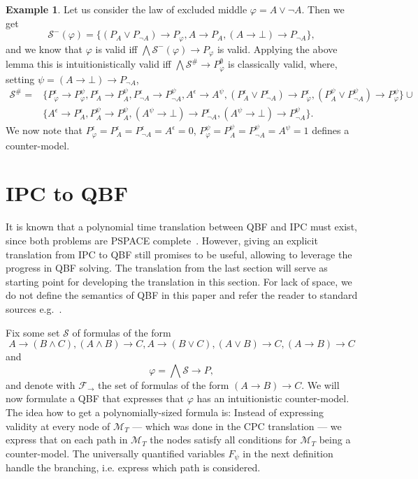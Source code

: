 \documentclass[a4paper,11pt]{report}
\theoremstyle{definition}
\theoremstyle{definition}
\theoremstyle{definition}
\theoremstyle{definition}
\theoremstyle{definition}
\theoremstyle{definition}
\newtheorem{example}[theorem]{Example}
\theoremstyle{definition}
\begin{document}
	\begin{example}
		Let us consider the law of excluded middle $\varphi = A\vee\neg A$. Then we get
		$$\mathcal S^-(\varphi) = \{(P_A\vee P_{\neg A})\to P_\varphi, A\to P_A, (A\to \bot)\to P_{\neg A}\},$$
		and we know that $\varphi$ is valid iff $\bigwedge \mathcal S^-(\varphi)\to P_\varphi$ is valid. Applying the above lemma this is intuitionistically valid iff $\bigwedge\mathcal S^\#\to P^\emptyset_\varphi$ is classically valid, where, setting $\psi = (A\to \bot)\to P_{\neg A}$,
		\begin{align*}
			\mathcal S^\# =&\{P_\varphi^\epsilon\to P_\varphi^{\psi}, P_A^\epsilon\to P_A^{\psi},P_{\neg A}^\epsilon\to P_{\neg A}^{\psi},A^\epsilon\to A^{\psi}, (P_A^\epsilon\vee P_{\neg A}^\epsilon)\to P_\varphi^\epsilon, (P_A^{\psi}\vee P_{\neg A}^{\psi})\to P_\varphi^{\psi}\}\cup\\ &\{A^\epsilon\to P_A^\epsilon, P_A^{\psi}\to P_A^{\psi}, (A^{\psi}\to \bot)\to P_{\neg A}^\epsilon, (A^{\psi}\to \bot)\to P_{\neg A}^{\psi}\}.
		\end{align*}
		We now note that $P_\varphi^\epsilon  = P_A^\epsilon = P_{\neg A}^\epsilon = A^\epsilon = 0$, $P_{\varphi}^{\psi} = P_A^{\psi} =  P_{\neg A}^{\psi} = A^{\psi} = 1$ defines a counter-model.
	\end{example}
	
	\section{IPC to QBF}
	
	It is known that a polynomial time translation between QBF and IPC must exist, since both problems are PSPACE complete~\cite{garey1979computers, statman1979intuitionistic}.
	However, giving an explicit translation from IPC to QBF still promises to be useful, allowing to leverage the progress in QBF solving.
	The translation from the last section will serve as starting point for developing the translation in this section.
	For lack of space, we do not define the semantics of QBF in this paper and refer the reader to standard sources e.g.~\cite{series/faia/2009-185}.
	
	Fix some set $\mathcal S$ of formulas of the form $$A\to (B\wedge C), (A\wedge B)\to C, A\to (B\vee C), (A\vee B)\to C, (A\to B)\to C$$and$$\varphi = \bigwedge \mathcal S\to P,$$
	and denote with $\mathcal F_\to$ the set of formulas of the form $(A\to B)\to C$. We will now formulate a QBF that expresses that $\varphi$ has an intuitionistic counter-model. The idea how to get a polynomially-sized formula is: Instead of expressing validity at every node of $\mathcal M_T$ --- which was done in the CPC translation --- we express that on each path in $\mathcal M_T$ the nodes satisfy all conditions for $\mathcal M_T$ being a counter-model. The universally quantified variables $F_\psi$ in the next definition handle the branching, i.e. express which path is considered.
	
\end{document}
